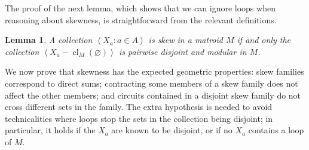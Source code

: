 \documentclass{amsart}
\theoremstyle{plain}
\newtheorem{lemma}[theorem]{Lemma}
\theoremstyle{definition}
\DeclareMathOperator{\cl}{cl}
\newcommand{\ab}[1]{\left\langle#1\right\rangle}
\newcommand{\es}{\varnothing}
\begin{document}
The proof of the next lemma, which shows that we can ignore loops when reasoning about skewness,
is straightforward from the relevant definitions. 

\begin{lemma}\label{skewdj}
  A collection $\ab{X_a : a \in A}$ is skew in a matroid $M$ if and only the collection
  $\ab{X_a - \cl_M(\es)}$ is pairwise disjoint and modular in $M$. 
\end{lemma}

We now prove that skewness has the expected geometric properties:
skew families correspond to direct sums; contracting some members of a skew family does not affect the other members;
and circuits contained in a disjoint skew family do not cross different sets in the family.
The extra hypothesis is needed to avoid technicalities where loops stop the sets in 
the collection being disjoint; in particular, it holds if the $X_a$ are
known to be disjoint, or if no $X_a$ contains a loop of $M$. 
\end{document}
